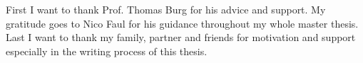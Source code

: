 First I want to thank Prof. Thomas Burg for his advice and support. My gratitude goes to Nico Faul for his guidance throughout my whole master thesis. Last I want to thank my family, partner and friends for motivation and support especially in the writing process of this thesis.